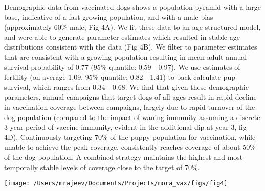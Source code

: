 \documentclass[tropicalmed,article,submit,moreauthors,pdftex]{mdpi}
\begin{document}
Demographic data from vaccinated dogs shows a population pyramid with a
large base, indicative of a fast-growing population, and with a male
bias (approximately 60\% male, Fig 4A). We fit these data to an
age-structured model, and were able to generate parameter estimates
which resulted in stable age distributions consistent with the data (Fig
4B). We filter to parameter estimates that are consistent with a growing
population resulting in mean adult annual survival probability of 0.77
(95\% quantile: 0.59 - 0.97). We use estimates of fertility (on average
1.09, 95\% quantile: 0.82 - 1.41) to back-calculate pup survival, which
ranges from 0.34 - 0.68. We find that given these demographic
parameters, annual campaigns that target dogs of all ages result in
rapid decline in vaccination coverage between campaigns, largely due to
rapid turnover of the dog population (compared to the impact of waning
immunity assuming a discrete 3 year period of vaccine immunity, evident
in the additional dip at year 3, fig 4D). Continuously targeting 70\% of
the puppy population for vaccination, while unable to achieve the peak
coverage, consistently reaches coverage of about 50\% of the dog
population. A combined strategy maintains the highest and most
temporally stable levels of coverage close to the target of 70\%.

\texttt{[image: /Users/mrajeev/Documents/Projects/mora\_vax/figs/fig4]}
\end{document}
